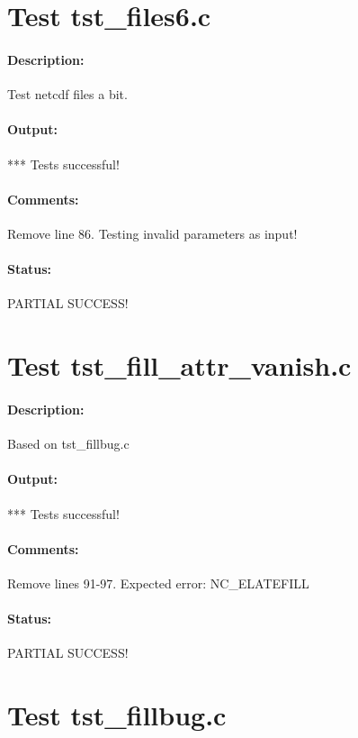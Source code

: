 \section{Test tst\_files6.c}

\paragraph{Description:} Test netcdf files a bit.

\paragraph{Output:} *** Tests successful!

\paragraph{Comments:} Remove line 86. Testing invalid parameters as input!

\paragraph{Status:} PARTIAL SUCCESS!

\section{Test tst\_fill\_attr\_vanish.c}

\paragraph{Description:} Based on tst\_fillbug.c

\paragraph{Output:} *** Tests successful!

\paragraph{Comments:} Remove lines 91-97. Expected error: NC\_ELATEFILL

\paragraph{Status:} PARTIAL SUCCESS!

\section{Test tst\_fillbug.c}

